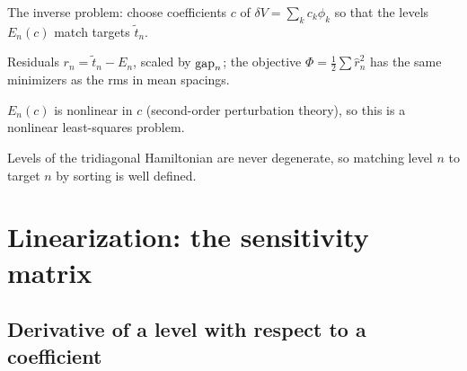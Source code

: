 \begin{keyideas}
\item The inverse problem: choose coefficients $c$ of $\delta V=\sum_kc_k\phi_k$ so that the levels $E_n(c)$ match targets $\tilde t_n$.
\item Residuals $r_n=\tilde t_n-E_n$, scaled by $\mathrm{gap}_n$; the objective $\Phi=\tfrac12\sum\hat r_n^2$ has the same minimizers as the rms in mean spacings.
\item $E_n(c)$ is nonlinear in $c$ (second-order perturbation theory), so this is a nonlinear least-squares problem.
\item Levels of the tridiagonal Hamiltonian are never degenerate, so matching level $n$ to target $n$ by sorting is well defined.
\end{keyideas}

\section{Linearization: the sensitivity matrix}\label{sec:fitting-sensitivity}

\subsection{Derivative of a level with respect to a coefficient}

